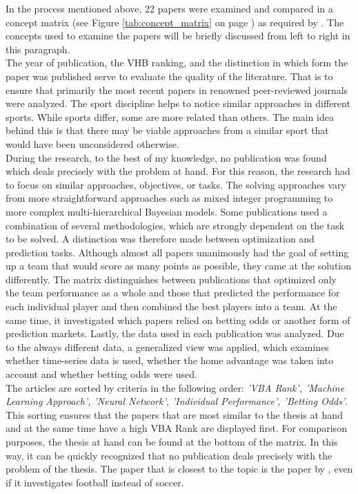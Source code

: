 In the process mentioned above, 22 papers were examined and compared in a concept matrix (see Figure \ref{tab:concept_matrix} on page \pageref{tab:concept_matrix}) as required by \citet{webster_guest_2002}. The concepts used to examine the papers will be briefly discussed from left to right in this paragraph. \\
\indent The year of publication, the VHB ranking, and the distinction in which form the paper was published serve to evaluate the quality of the literature. That is to ensure that primarily the most recent papers in renowned peer-reviewed journals were analyzed. The sport discipline helps to notice similar approaches in different sports. While sports differ, some are more related than others. The main idea behind this is that there may be viable approaches from a similar sport that would have been unconsidered otherwise.  \\
\indent During the research, to the best of my knowledge, no publication was found which deals precisely with the problem at hand. For this reason, the research had to focus on similar approaches, objectives, or tasks. The solving approaches vary from more straightforward approaches such as mixed integer programming to more complex multi-hierarchical Bayesian models. Some publications used a combination of several methodologies, which are strongly dependent on the task to be solved. A distinction was therefore made between optimization and prediction tasks. Although almost all papers unanimously had the goal of setting up a team that would score as many points as possible, they came at the solution differently. The matrix distinguishes between publications that optimized only the team performance as a whole and those that predicted the performance for each individual player and then combined the best players into a team. At the same time, it investigated which papers relied on betting odds or another form of prediction markets. Lastly, the data used in each publication was analyzed. Due to the always different data, a generalized view was applied, which examines whether time-series data is used, whether the home advantage was taken into account and whether betting odds were used. \\
\indent The articles are sorted by criteria in the following order: \emph{'VBA Rank', 'Machine Learning Approach', 'Neural Network', 'Individual Performance', 'Betting Odds'}. This sorting ensures that the papers that are most similar to the thesis at hand and at the same time have a high VBA Rank are displayed first. For comparison purposes, the thesis at hand can be found at the bottom of the matrix. In this way, it can be quickly recognized that no publication deals precisely with the problem of the thesis. The paper that is closest to the topic is the paper by \citet{landers_machine_2017}, even if it investigates football instead of soccer.

